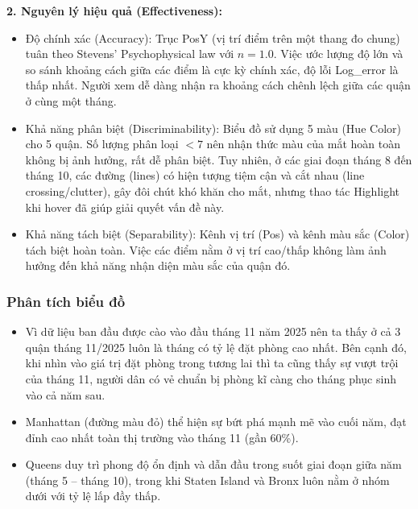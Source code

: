 \textbf{2. Nguyên lý hiệu quả (Effectiveness):}

\begin{itemize}
    \item Độ chính xác (Accuracy): Trục PosY (vị trí điểm trên một thang đo chung) tuân theo Stevens' Psychophysical law với $n = 1.0$. Việc ước lượng độ lớn và so sánh khoảng cách giữa các điểm là cực kỳ chính xác, độ lỗi Log\_error là thấp nhất. Người xem dễ dàng nhận ra khoảng cách chênh lệch giữa các quận ở cùng một tháng.
    \item Khả năng phân biệt (Discriminability): Biểu đồ sử dụng 5 màu (Hue Color) cho 5 quận. Số lượng phân loại $< 7$ nên nhận thức màu của mắt hoàn toàn không bị ảnh hưởng, rất dễ phân biệt. Tuy nhiên, ở các giai đoạn tháng 8 đến tháng 10, các đường (lines) có hiện tượng tiệm cận và cắt nhau (line crossing/clutter), gây đôi chút khó khăn cho mắt, nhưng thao tác Highlight khi hover đã giúp giải quyết vấn đề này.
    \item Khả năng tách biệt (Separability): Kênh vị trí (Pos) và kênh màu sắc (Color) tách biệt hoàn toàn. Việc các điểm nằm ở vị trí cao/thấp không làm ảnh hưởng đến khả năng nhận diện màu sắc của quận đó.
\end{itemize}

\subsubsection{Phân tích biểu đồ}

\begin{itemize}
    \item Vì dữ liệu ban đầu được cào vào đầu tháng 11 năm 2025 nên ta thấy ở cả 3 quận tháng 11/2025 luôn là tháng có tỷ lệ đặt phòng cao nhất. Bên cạnh đó, khi nhìn vào giá trị đặt phòng trong tương lai thì ta cũng thấy sự vượt trội của tháng 11, người dân có vẻ chuẩn bị phòng kĩ càng cho tháng phục sinh vào cả năm sau.
    \item Manhattan (đường màu đỏ) thể hiện sự bứt phá mạnh mẽ vào cuối năm, đạt đỉnh cao nhất toàn thị trường vào tháng 11 (gần 60\%).
    \item Queens duy trì phong độ ổn định và dẫn đầu trong suốt giai đoạn giữa năm (tháng 5 -- tháng 10), trong khi Staten Island và Bronx luôn nằm ở nhóm dưới với tỷ lệ lấp đầy thấp.
\end{itemize}
